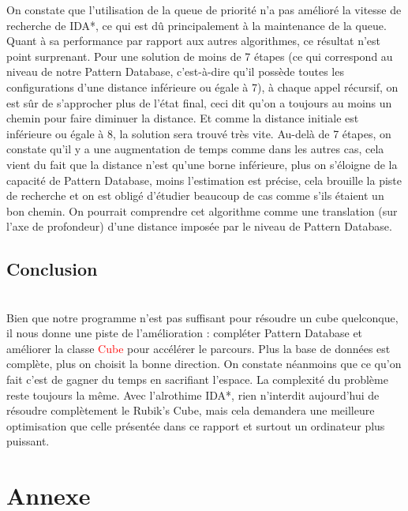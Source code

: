 \documentclass[fleqn,10pt,french]{SelfArx} %
\newcommand{\class}[1]{\colorbox{bg}{\textcolor{red}{\usefont{OT1}{cmtt}{m}{n}#1}}}
\begin{document}
\indent
On constate que l’utilisation de la queue de priorité n’a pas amélioré la vitesse de recherche de IDA*, ce qui est dû principalement à la maintenance de la queue. Quant à sa performance par rapport aux autres algorithmes, ce résultat n’est point surprenant. Pour une solution de moins de 7 étapes (ce qui correspond au niveau de notre Pattern Database, c’est-à-dire qu’il possède toutes les configurations d’une distance inférieure ou égale à 7), à chaque appel récursif, on est sûr de s’approcher plus de l’état final, ceci dit qu’on a toujours au moins un chemin pour faire diminuer la distance. Et comme la distance initiale est inférieure ou égale à 8, la solution sera trouvé très vite. Au-delà de 7 étapes, on constate qu’il y a une augmentation de temps comme dans les autres cas, cela vient du fait que la distance n’est qu’une borne inférieure, plus on s’éloigne de la capacité de Pattern Database, moins l’estimation est précise, cela brouille la piste de recherche et on est obligé d’étudier beaucoup de cas comme s’ils étaient un bon chemin. On pourrait comprendre cet algorithme comme une translation (sur l’axe de profondeur) d’une distance imposée par le niveau de Pattern Database.

\subsection{Conclusion}

~\\\indent
Bien que notre programme n’est pas suffisant pour résoudre un cube quelconque, il nous donne une piste de l’amélioration : compléter Pattern Database et améliorer la classe \class{Cube} pour accélérer le parcours. Plus la base de données est complète, plus on choisit la bonne direction. On constate néanmoins que ce qu’on fait c’est de gagner du temps en sacrifiant l’espace. La complexité du problème reste toujours la même. Avec l’alrothime IDA*, rien n’interdit aujourd’hui de résoudre complètement le Rubik’s Cube, mais cela demandera une meilleure optimisation que celle présentée dans ce rapport et surtout un ordinateur plus puissant.

\section*{Annexe} %
\end{document}
